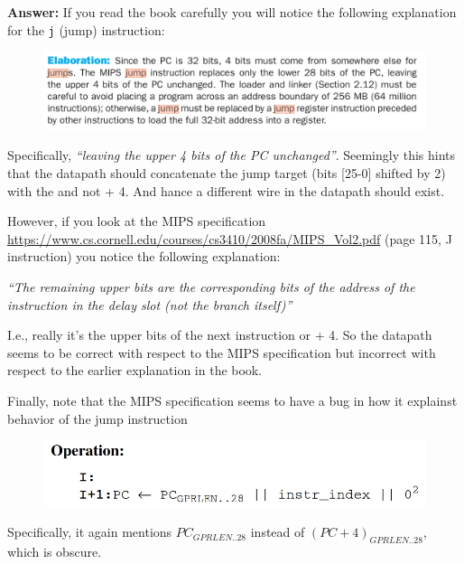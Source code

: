 \documentclass[11pt]{exam}
\begin{document}
\begin{questions}
\begin{parts}
\textbf{Answer:} If you read the book carefully you will notice the following
	explanation for the \texttt{j} (jump) instruction: 

\begin{figure}[h] \centering
	\includegraphics[width=0.7\columnwidth]{figs/jump.png}
	\label{fig:jump}
\end{figure} 
	
	
Specifically, \emph{``leaving the upper 4 bits of the PC unchanged''}.
Seemingly this hints that the datapath should concatenate the jump target (bits
[25-0] shifted by 2) with the \pc{} and not \pc{} + 4. And hance a different
wire in the datapath should exist. 

However, if you look at the MIPS specification
\url{https://www.cs.cornell.edu/courses/cs3410/2008fa/MIPS_Vol2.pdf} (page 115,
J instruction) you notice the following explanation: 

\emph{``The remaining upper bits are the corresponding bits of the address of
the instruction in the delay slot (not the branch itself)''}

I.e., really it's the upper bits of the next instruction or \pc{} + 4. So the
datapath seems to be correct with respect to the MIPS specification but
incorrect with respect to the earlier explanation in the book. 

Finally, note that the MIPS specification seems to have a bug in how it
explainst behavior of the jump instruction

\begin{figure}[h] \centering
	\includegraphics[width=0.5\columnwidth]{figs/jump-mips.png}
	\label{fig:jump-mips}
\end{figure} 
	
Specifically, it again mentions $PC_{GPRLEN..28}$ instead of $(PC
+4)_{GPRLEN..28}$, which is obscure. 

	

\vfill


\end{parts}





\end{questions}
\afterpage{\null\newpage}
\end{document}
